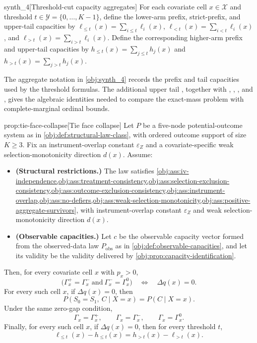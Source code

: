 \begin{definitionv}{synth_4}[Threshold-cut capacity aggregates]
For each covariate cell $x\in\mathcal X$ and threshold $t\in\mathcal Y=\{0,\ldots,K-1\}$, define the lower-arm prefix, strict-prefix, and upper-tail capacities by $\ell_{\le t}(x)=\sum_{i\le t}\ell_i(x)$, $\ell_{<t}(x)=\sum_{i<t}\ell_i(x)$, and $\ell_{>t}(x)=\sum_{i>t}\ell_i(x)$. Define the corresponding higher-arm prefix and upper-tail capacities by $h_{\le t}(x)=\sum_{j\le t}h_j(x)$ and $h_{>t}(x)=\sum_{j>t}h_j(x)$.
\end{definitionv}

The aggregate notation in \cref{obj:synth_4} records the prefix and tail capacities used by the threshold formulas. The additional upper tail , together with , , , and , gives the algebraic identities needed to compare the exact-mass problem with complete-marginal ordinal bounds.

\begin{theoremv}{prop:tie-face-collapse}[Tie face collapse]
Let \(P\) be a five-node potential-outcome system as in \cref{obj:def:structural-law-class}, with ordered outcome support of size \(K\ge 3\). Fix an instrument-overlap constant \(\varepsilon_Z\) and a covariate-specific weak selection-monotonicity direction \(d(x)\). Assume:
\begin{itemize}
\item \textbf{(Structural restrictions.)} The law satisfies \cref{obj:ass:iv-independence,obj:ass:treatment-consistency,obj:ass:selection-exclusion-consistency,obj:ass:outcome-exclusion-consistency,obj:ass:instrument-overlap,obj:ass:no-defiers,obj:ass:weak-selection-monotonicity,obj:ass:positive-aggregate-survivors}, with instrument-overlap constant \(\varepsilon_Z\) and weak selection-monotonicity direction \(d(x)\).
\item \textbf{(Observable capacities.)} Let \(c\) be the observable capacity vector formed from the observed-data law \(P_{\mathrm{obs}}\) as in \cref{obj:def:observable-capacities}, and let its validity be the validity delivered by \cref{obj:prop:capacity-identification}.
\end{itemize}
Then, for every covariate cell \(x\) with \(p_x>0\),
\[
\bigl(\Gamma_x^{+}=\Gamma_x^{-}\ \text{and}\ \Gamma_x^{-}=\Gamma_x^{0}\bigr)
\quad\Longleftrightarrow\quad
\Delta q(x)=0 .
\]
For every such cell \(x\), if \(\Delta q(x)=0\), then
\[
P(S_0=S_1,\ C\mid X=x)=P(C\mid X=x).
\]
Under the same zero-gap condition,
\[
\Gamma_x=\Gamma_x^{+},
\qquad
\Gamma_x=\Gamma_x^{-},
\qquad
\Gamma_x=\Gamma_x^{0}.
\]
Finally, for every such cell \(x\), if \(\Delta q(x)=0\), then for every threshold \(t\),
\[
\ell_{\le t}(x)-h_{\le t}(x)=h_{>t}(x)-\ell_{>t}(x).
\]
\end{theoremv}

